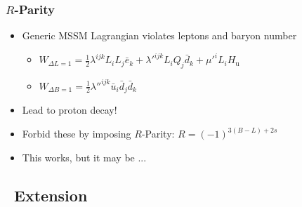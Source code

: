 \documentclass[10pt, svgnames]{beamer}
\begin{document}
\begin{frame}
  \frametitle{$R$-Parity}
  \begin{itemize}
    \item Generic MSSM Lagrangian violates leptons and baryon number
      \begin{itemize}
        \item 
          $W_{\Delta L = 1} =
          \frac{1}{2} \lambda^{ijk} L_{i} L_{j} \bar{e}_{k} +
          \lambda'^{ijk} L_{i} Q_{j} \bar{d}_{k} +
          \mu'^{i} L_{i} H_\mathrm{u}$
        \item 
          $W_{\Delta B = 1} =
          \frac{1}{2} \lambda''^{ijk} \bar{u}_{i} \bar{d}_{j} \bar{d}_{k}$
      \end{itemize}
    \item Lead to proton decay!
    \item Forbid these by imposing {\color{nice_blue} $R$-Parity}:
      $R=(-1)^{3(B-L)+2s}$
    \item This works, but it may be ...
  \end{itemize}
\end{frame}

\subsection{\BMINUSL\ Extension}
\end{document}
